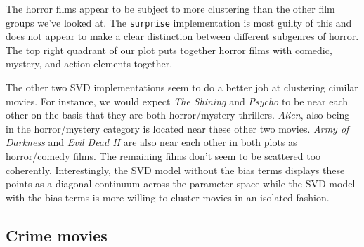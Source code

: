 The horror films appear to be subject to more clustering than the other film groups we've looked at. The \texttt{surprise} implementation is most 
guilty of this and does not appear to make a clear distinction between different subgenres of horror. The top right quadrant of our plot 
puts together horror films with comedic, mystery, and action elements together.
\par 
The other two SVD implementations seem to do a better job at clustering cimilar movies. For instance, we would expect \textit{The Shining} and 
\textit{Psycho} to be near each other on the basis that they are both horror/mystery thrillers. \textit{Alien}, also being in the horror/mystery 
category is located near these other two movies. \textit{Army of Darkness} and \textit{Evil Dead II} are also near each other in both plots 
as horror/comedy films. The remaining films don't seem to be scattered too coherently. Interestingly, the SVD model without the bias terms 
displays these points as a diagonal continuum across the parameter space while the SVD model with the bias terms is more willing to cluster 
movies in an isolated fashion.

\subsection{Crime movies}

